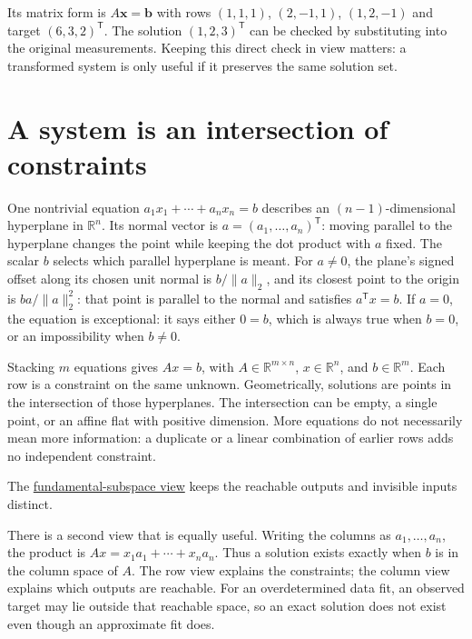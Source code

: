 Its matrix form is \(A\mathbf x=\mathbf b\) with rows \((1,1,1)\), \((2,-1,1)\), \((1,2,-1)\) and target \((6,3,2)^\mathsf T\). The solution \((1,2,3)^\mathsf T\) can be checked by substituting into the original measurements. Keeping this direct check in view matters: a transformed system is only useful if it preserves the same solution set.

\section{A system is an intersection of constraints}\label{01-foundations-i-ch019-a-system-is-an-intersection-of-constraints}

One nontrivial equation \(a_1x_1+\cdots+a_nx_n=b\) describes an \((n-1)\)-dimensional hyperplane in \(\mathbb R^n\). Its normal vector is \(a=(a_1,\ldots,a_n)^\mathsf T\): moving parallel to the hyperplane changes the point while keeping the dot product with \(a\) fixed. The scalar \(b\) selects which parallel hyperplane is meant. For \(a\ne0\), the plane's signed offset along its chosen unit normal is \(b/\|a\|_2\), and its closest point to the origin is \(ba/\|a\|_2^2\): that point is parallel to the normal and satisfies \(a^\mathsf Tx=b\). If \(a=0\), the equation is exceptional: it says either \(0=b\), which is always true when \(b=0\), or an impossibility when \(b\ne0\).

Stacking \(m\) equations gives \(Ax=b\), with \(A\in\mathbb R^{m\times n}\), \(x\in\mathbb R^n\), and \(b\in\mathbb R^m\). Each row is a constraint on the same unknown. Geometrically, solutions are points in the intersection of those hyperplanes. The intersection can be empty, a single point, or an affine flat with positive dimension. More equations do not necessarily mean more information: a duplicate or a linear combination of earlier rows adds no independent constraint.

The \hyperref[01-foundations-i-ch019-a-system-is-an-intersection-of-constraints]{fundamental-subspace view} keeps the reachable outputs and invisible inputs distinct.

There is a second view that is equally useful. Writing the columns as \(a_1,\ldots,a_n\), the product is \(Ax=x_1a_1+\cdots+x_na_n\). Thus a solution exists exactly when \(b\) is in the column space of \(A\). The row view explains the constraints; the column view explains which outputs are reachable. For an overdetermined data fit, an observed target may lie outside that reachable space, so an exact solution does not exist even though an approximate fit does.

